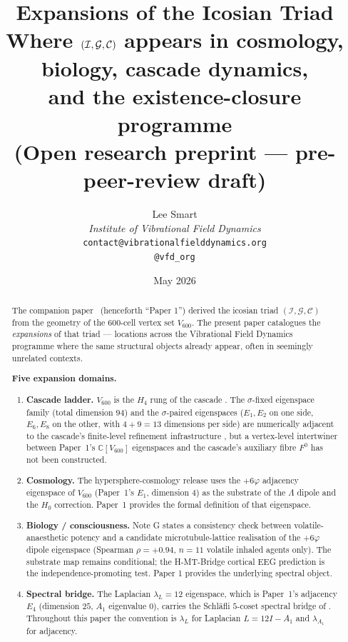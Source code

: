 \documentclass[11pt,a4paper]{article}
\title{\textbf{Expansions of the Icosian Triad}\\[2pt]
\large Where $(\II, \GG, \CC)$ appears in cosmology, biology, cascade dynamics,\\[1pt]
and the existence-closure programme\\[6pt]
\small (Open research preprint --- pre-peer-review draft)}
\author{%
  Lee Smart\\[4pt]
  \textit{Institute of Vibrational Field Dynamics}\\[2pt]
  \texttt{contact@vibrationalfielddynamics.org}\\[2pt]
  \texttt{@vfd\_org}%
}
\date{May 2026}
\theoremstyle{definition}
\theoremstyle{remark}
\newcommand{\C}{\mathbb{C}}
\newcommand{\II}{\mathcal{I}}
\newcommand{\GG}{\mathcal{G}}
\newcommand{\CC}{\mathcal{C}}
\begin{document}
\maketitle
\thispagestyle{empty}

\begin{abstract}
\noindent
The companion paper~\cite{icosianTriadCore} (henceforth ``Paper 1'') derived
the icosian triad $(\II, \GG, \CC)$ from the geometry of the
$600$-cell vertex set $V_{600}$. The present paper catalogues the
\emph{expansions} of that triad — locations across the Vibrational Field
Dynamics programme where the same structural objects already appear, often
in seemingly unrelated contexts.

\smallskip\noindent\textbf{Five expansion domains.}
\begin{enumerate}
\item \textbf{Cascade ladder.} $V_{600}$ is the $H_4$ rung of the
cascade \cite{cascadeDerivation,cascadeRefinementPapers}. The
$\sigma$-fixed eigenspace family (total dimension $94$) and the
$\sigma$-paired eigenspaces ($E_1, E_2$ on one side, $E_6, E_8$ on the
other, with $4 + 9 = 13$ dimensions per side) are numerically adjacent
to the cascade's finite-level refinement infrastructure
\cite{cascadeRefinementPapers,cascadeSelectionH4}, but a vertex-level
intertwiner between Paper~1's $\C[V_{600}]$ eigenspaces and the
cascade's auxiliary fibre $F^0$ has not been constructed.

\item \textbf{Cosmology.} The hypersphere-cosmology release
\cite{hypersphereCosmology} uses the $+6\varphi$ adjacency eigenspace
of $V_{600}$ (Paper~1's $E_1$, dimension $4$) as the substrate of the
$\Lambda$ dipole and the $H_0$ correction. Paper~1 provides the formal
definition of that eigenspace.

\item \textbf{Biology / consciousness.} Note G \cite{noteG} states a
consistency check between volatile-anaesthetic potency and a candidate
microtubule-lattice realisation of the $+6\varphi$ dipole eigenspace
(Spearman $\rho = +0.94$, $n=11$ volatile inhaled agents only). The
substrate map remains conditional; the H-MT-Bridge cortical EEG
prediction is the independence-promoting test. Paper 1 provides the
underlying spectral object.

\item \textbf{Spectral bridge.} The Laplacian $\lambda_L = 12$
eigenspace, which is Paper~1's adjacency $E_4$ (dimension $25$, $A_1$
eigenvalue $0$), carries the Schl\"afli $5$-coset spectral bridge of
\cite{schlafliBridge,spectralBridge24600}. Throughout this paper the
convention is $\lambda_L$ for Laplacian $L = 12 I - A_1$ and
$\lambda_{A_1}$ for adjacency.


\end{enumerate}
\end{abstract}
\end{document}
